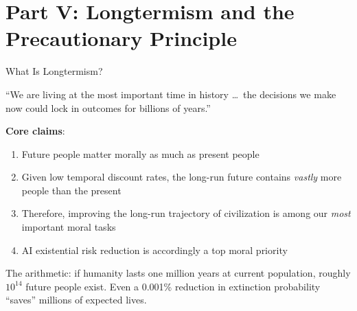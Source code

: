 \documentclass[aspectratio=169,11pt]{beamer}
\begin{document}
\section{Part V: Longtermism and the Precautionary Principle}

\begin{frame}[shrink=17]{What Is Longtermism?}
\begin{conceptbox}
``We are living at the most important time in history \ldots\ the decisions we make now could lock in outcomes for billions of years.''

\vspace{0.15cm}
\textbf{Core claims}:
\begin{enumerate}
    \item Future people matter morally as much as present people
    \item Given low temporal discount rates, the long-run future contains \emph{vastly} more people than the present
    \item Therefore, improving the long-run trajectory of civilization is among our \emph{most} important moral tasks
    \item AI existential risk reduction is accordingly a top moral priority
\end{enumerate}
\vspace{0.1cm}
\scriptsize\textcite{macaskill_future_2022}
\end{conceptbox}

\vspace{0.2cm}
The arithmetic: if humanity lasts one million years at current population, roughly $10^{14}$ future people exist. Even a 0.001\% reduction in extinction probability ``saves'' millions of expected lives.
\end{frame}
\end{document}
